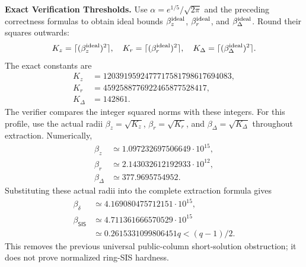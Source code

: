 \documentclass[lettersize,journal]{IEEEtran}
\newcommand{\parab}[1]{\noindent\textbf{#1} }
\begin{document}
	\parab{Exact Verification Thresholds.}
	Use $\alpha=e^{1/5}/\sqrt{2\pi}$ and the preceding correctness formulas
	to obtain ideal bounds $\beta_z^{\rm ideal}$, $\beta_r^{\rm ideal}$,
	and $\beta_\Delta^{\rm ideal}$. Round their squares outwards:
	\[
	K_z=\lceil(\beta_z^{\rm ideal})^2\rceil,\quad
	K_r=\lceil(\beta_r^{\rm ideal})^2\rceil,\quad
	K_\Delta=\lceil(\beta_\Delta^{\rm ideal})^2\rceil.
	\]
	The exact constants are
	\[
	\begin{aligned}
		K_z&=1203919592477717581798617694083,\\
		K_r&=4592588776922465877528417,\\
		K_\Delta&=142861.
	\end{aligned}
	\]
	The verifier compares the integer squared norms with these integers.
	For this profile, use the actual radii
	$\beta_z=\sqrt{K_z}$, $\beta_r=\sqrt{K_r}$, and
	$\beta_\Delta=\sqrt{K_\Delta}$ throughout extraction. Numerically,
	\[
	\begin{aligned}
		\beta_z&\simeq1.097232697506649\cdot10^{15},\\
		\beta_r&\simeq2.143032612192933\cdot10^{12},\\
		\beta_\Delta&\simeq377.9695754952.
	\end{aligned}
	\]
	Substituting these actual radii into the complete extraction formula gives
	\[
	\begin{aligned}
		\beta_\delta&\simeq4.169080475712151\cdot10^{15},\\
		\beta_{\mathsf{SIS}}&\simeq4.711361666570529\cdot10^{15}\\
		&\simeq0.2615331099806451q<(q-1)/2.
	\end{aligned}
	\]
	This removes the previous universal public-column short-solution
	obstruction; it does not prove normalized ring-SIS hardness.
	
\end{document}
